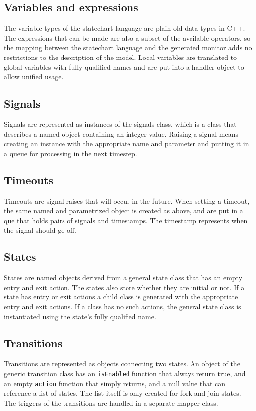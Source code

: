 \documentclass{book}
\begin{document}
{  \subsection{Variables and expressions}
The variable types of the statechart language are plain old data types in C++. The expressions that can be made are also a subset of the available operators, so the mapping between the statechart language and the generated monitor adds no restrictions to the description of the model. Local variables are translated to global variables with fully qualified names and are put into a handler object to allow unified usage.
  \subsection{Signals}
Signals are represented as instances of the signals class, which is a class that describes a named object containing an integer value. Raising a signal means creating an instance with the appropriate name and parameter and putting it in a queue for processing in the next timestep.
  \subsection{Timeouts}
Timeouts are signal raises that will occur in the future. When setting a timeout, the same named and parametrized object is created as above, and are put in a que that holds pairs of signals and timestamps. The timestamp represents when the signal should go off.
  \subsection{States}
States are named objects derived from a general state class that has an empty entry and exit action. The states also store whether they are initial or not. If a state has entry or exit actions a child class is generated with the appropriate entry and exit actions. If a class has no such actions, the general state class is instantiated using the state's fully qualified name.
  \subsection{Transitions}
Transitions are represented as objects connecting two states. An object of the generic transition class has an \verb!isEnabled! function that always return true, and an empty \verb!action! function that simply returns, and a null value that can reference a list of states. The list itself is only created for fork and join states. The triggers of the transitions are handled in a separate mapper class.
}
\end{document}
